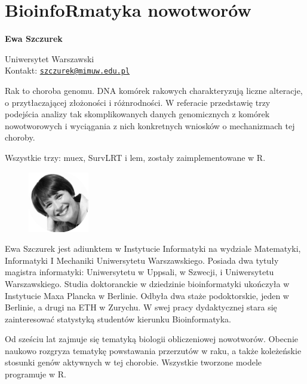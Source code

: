 \documentclass[\main/boa.tex]{subfiles}
\begin{document}
\section{BioinfoRmatyka nowotworów}


\begin{minipage}{0.915\textwidth}
	\centering
  {\bf \LARGE {} Ewa Szczurek}
\end{minipage}



\begin{affiliations}
\begin{minipage}{0.915\textwidth}
\centering
\large Uniwersytet Warszawski  \\[1pt]
Kontakt: \href{mailto:szczurek@mimuw.edu.pl}{\nolinkurl{szczurek@mimuw.edu.pl}}\\
\end{minipage}
\end{affiliations}


Rak to choroba genomu. DNA komórek rakowych charakteryzują liczne alteracje, \\ o przytłaczającej złożoności i różnrodności. W referacie przedstawię trzy podejścia analizy tak skomplikowanych danych genomicznych z komórek nowotworowych i wyciągania z nich konkretnych wniosków o mechanizmach tej choroby. 

Wszystkie trzy: muex, SurvLRT i lem, zostały zaimplementowane w R. 

\bio
\begin{figure}
    \includegraphics[width=100px]{img/guests/czarno_biale/eszczurek-crop.png}
\end{figure} 
Ewa Szczurek jest adiunktem w Instytucie Informatyki na wydziale Matematyki, Informatyki I Mechaniki Uniwersytetu Warszawskiego. Posiada dwa tytuły magistra informatyki: Uniwersytetu w Uppsali, w Szwecji, i Uniwersytetu Warszawskiego. Studia doktoranckie w dziedzinie bioinformatyki ukończyła w Instytucie Maxa Plancka w Berlinie. Odbyła dwa staże podoktorskie, jeden w Berlinie, a drugi na ETH w Zurychu. W swej pracy dydaktycznej stara się zainteresować statystyką studentów kierunku Bioinformatyka.

Od sześciu lat zajmuje się tematyką biologii obliczeniowej nowotworów. Obecnie naukowo rozgryza tematykę powstawania przerzutów w raku, a także koleżeńskie stosunki genów aktywnych w tej chorobie. Wszystkie tworzone modele programuje w R.
\end{document}
